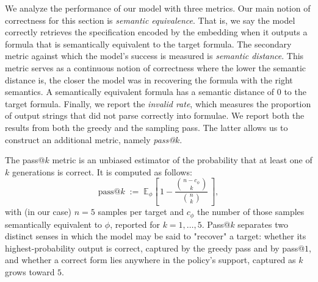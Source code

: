 \documentclass[titlepage,a4paper,11pt]{report}
\begin{document}
    We analyze the performance of our model with three metrics. Our main notion of correctness for this section is \textit{semantic equivalence}. That is, we say the model correctly retrieves the specification encoded by the embedding when it outputs a formula that is semantically equivalent to the target formula. The secondary metric against which the model's success is measured is \textit{semantic distance}. This metric serves as a continuous notion of correctness where the lower the semantic distance is, the closer the model was in recovering the formula with the right semantics. A semantically equivalent formula has a semantic distance of 0 to the target formula. Finally, we report the \textit{invalid rate}, which measures the proportion of output strings that did not parse correctly into formulae.  We report both the results from both the greedy and the sampling pass. The latter allows us to construct an additional metric, namely \textit{pass@$k$}.

    The pass@$k$ metric is an unbiased estimator \citep{chen_evaluating_2021} of the probability that at least one of $k$ generations is correct. It is computed as follows:
    \begin{equation}\label{eq:pass_at_k}
        \mathrm{pass@}k \;:=\; \mathbb{E}_{\phi}\!\left[\, 1 - \frac{\binom{n - c_\phi}{k}}{\binom{n}{k}} \,\right],
    \end{equation}
    with (in our case) $n = 5$ samples per target and $c_\phi$ the number of those samples semantically equivalent to $\phi$, reported for $k = 1, \dots, 5$. Pass@$k$ separates two distinct senses in which the model may be said to "recover" a target: whether its highest-probability output is correct, captured by the greedy pass and by pass@$1$, and whether a correct form lies anywhere in the policy's support, captured as $k$ grows toward $5$.

    
\end{document}
